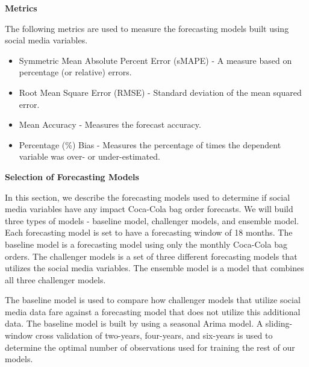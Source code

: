 \documentclass[12pt,oneside]{chicagocapstone}
\begin{document}
\textbf{Metrics}

The following metrics are used to measure the forecasting models built using social media variables.
\begin{itemize}
\item
  Symmetric Mean Absolute Percent Error (sMAPE) - A measure based on percentage (or relative) errors.
\item
  Root Mean Square Error (RMSE) - Standard deviation of the mean squared error.
\item
  Mean Accuracy - Measures the forecast accuracy.
\item
  Percentage (\%) Bias - Measures the percentage of times the dependent variable was over- or under-estimated.
\end{itemize}
\textbf{Selection of Forecasting Models}

In this section, we describe the forecasting models used to determine if social media variables have any impact Coca-Cola bag order forecasts. We will build three types of models - baseline model, challenger models, and ensemble model. Each forecasting model is set to have a forecasting window of 18 months. The baseline model is a forecasting model using only the monthly Coca-Cola bag orders. The challenger models is a set of three different forecasting models that utilizes the social media variables. The ensemble model is a model that combines all three challenger models.

The baseline model is used to compare how challenger models that utilize social media data fare against a forecasting model that does not utilize this additional data. The baseline model is built by using a seasonal Arima model. A sliding-window cross validation of two-years, four-years, and six-years is used to determine the optimal number of observations used for training the rest of our models.
\end{document}
